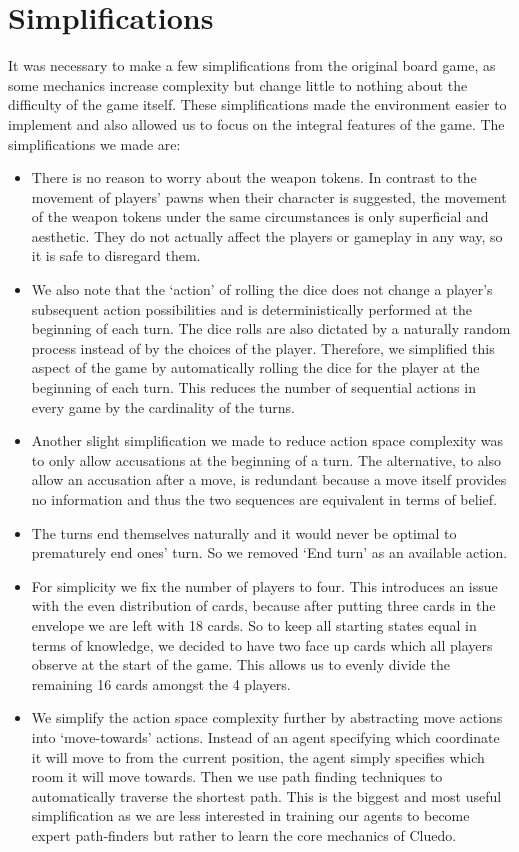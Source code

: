 \documentclass[msc, ai, logo, twoside, notimes, parskip, leftchapter, normalheadings]{infthesis}
\begin{document}
\section{Simplifications}
It was necessary to make a few simplifications from the original board game, as some mechanics increase complexity but change little to nothing about the difficulty of the game itself. These simplifications made the environment easier to implement and also allowed us to focus on the integral features of the game. The simplifications we made are:
\begin{itemize}
\item There is no reason to worry about the weapon tokens. In contrast to the movement of players' pawns when their character is suggested, the movement of the weapon tokens under the same circumstances is only superficial and aesthetic. They do not actually affect the players or gameplay in any way, so it is safe to disregard them. 
\item We also note that the `action' of rolling the dice does not change a player's subsequent action possibilities and is deterministically performed at the beginning of each turn. The dice rolls are also dictated by a naturally random process instead of by the choices of the player. Therefore, we simplified this aspect of the game by automatically rolling the dice for the player at the beginning of each turn. This reduces the number of sequential actions in every game by the cardinality of the turns.
\item Another slight simplification we made to reduce action space complexity was to only allow accusations at the beginning of a turn. The alternative, to also allow an accusation after a move, is redundant because a move itself provides no information and thus the two sequences are equivalent in terms of belief.
\item The turns end themselves naturally and it would never be optimal to prematurely end ones' turn. So we removed `End turn' as an available action.
\item For simplicity we fix the number of players to four. This introduces an issue with the even distribution of cards, because after putting three cards in the envelope we are left with 18 cards. So to keep all starting states equal in terms of knowledge, we decided to have two face up cards which all players observe at the start of the game. This allows us to evenly divide the remaining 16 cards amongst the 4 players.
\item We simplify the action space complexity further by abstracting move actions into `move-towards' actions. Instead of an agent specifying which coordinate it will move to from the current position, the agent simply specifies which room it will move towards. Then we use path finding techniques to automatically traverse the shortest path. This is the biggest and most useful simplification as we are less interested in training our agents to become expert path-finders but rather to learn the core mechanics of Cluedo.

\end{itemize}
\end{document}
